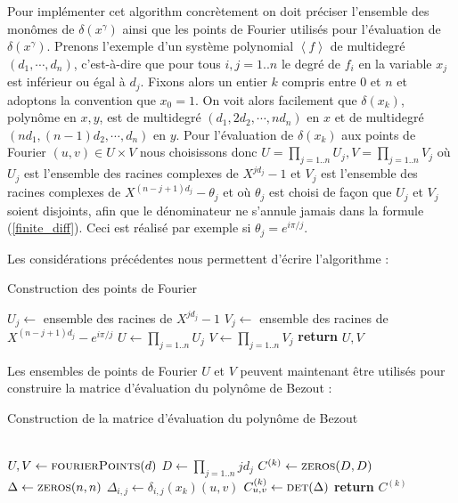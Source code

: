 \documentclass{standalone}
\begin{document}
Pour implémenter cet algorithm concrètement on doit préciser l'ensemble des monômes de $\delta(x^\gamma)$ ainsi que les points de Fourier utilisés pour l'évaluation de $\delta(x^\gamma)$. Prenons l'exemple d'un système polynomial $\left<f\right>$ de multidegré $(d_1, \cdots, d_n)$, c'est-à-dire que pour tous $i, j = 1..n$ le degré de $f_i$ en la variable $x_j$ est inférieur ou égal à $d_j$. Fixons alors un entier $k$ compris entre $0$ et $n$ et adoptons la convention que $x_0 = 1$. On voit alors facilement que $\delta(x_k)$, polynôme en $x, y$, est de multidegré $(d_1, 2d_2, \cdots, nd_n)$ en $x$ et de multidegré $(nd_1, (n-1)d_2, \cdots, d_n)$ en $y$.
 Pour l'évaluation de $\delta(x_k)$ aux points de Fourier $(u, v) \in U\times V$ nous choisissons donc $U = \prod_{j=1..n} U_j, V = \prod_{j=1..n} V_j$ o\`u $U_j$ est l'ensemble des racines complexes de $X^{jd_j} - 1$ et $V_j$ est l'ensemble des racines complexes de $X^{(n-j+1)d_j} - \theta_j$ et o\`u $\theta_j$ est choisi de façon que $U_j$ et $V_j$ soient disjoints, afin que le dénominateur ne s'annule jamais dans la formule (\ref{finite_diff}). Ceci est réalisé par exemple si $\theta_j = e^{i\pi/j}$.

Les considérations précédentes nous permettent d'écrire l'algorithme :

\begin{algorithm}
\caption{Construction des points de Fourier}\label{fourierPoints}
\begin{algorithmic}
 
 
\State $U_j \gets$ ensemble des racines de $X^{jd_j}-1$
\State $V_j \gets$ ensemble des racines de $X^{(n-j+1)d_j}-e^{i\pi/j}$
\EndFor
\State $U \gets \prod_{j=1..n}U_j$
\State $V \gets \prod_{j=1..n}V_j$
\State \textbf{return} $U, V$
\EndFunction
\end{algorithmic}
\end{algorithm}

Les ensembles de points de Fourier $U$ et $V$ peuvent maintenant être utilisés pour construire la matrice d'évaluation du polynôme de Bezout :
\begin{algorithm}[H]
\caption{Construction de la matrice d'évaluation du polynôme de Bezout}\label{evaluation}
\begin{algorithmic}
 \\
\State $U, V \gets \textsc{fourierPoints}(d)$
\State $D \gets \prod_{j=1..n}jd_j$
\State $C^{(k)} \gets \textsc{zeros}(D, D)$
      \State $\Delta \gets \textsc{zeros}(n, n)$
      		\State $\Delta_{i,j} \gets \delta_{i,j}(x_k)(u, v)$ 
   		\EndFor
		\State $C^{(k)}_{u, v} \gets \textsc{det}(\Delta)$
	\EndFor
\State \textbf{return} $C^{(k)}$
\EndFunction
\end{algorithmic}
\end{algorithm}
\end{document}
